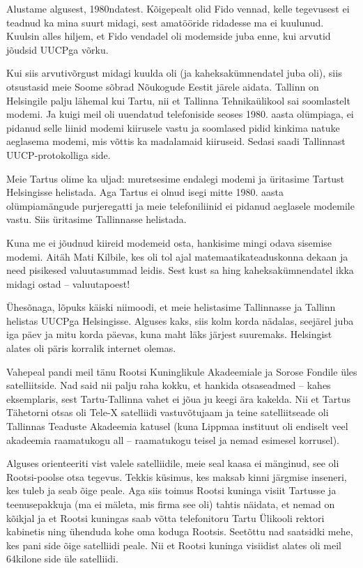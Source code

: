 Alustame algusest, 1980ndatest. Kõigepealt 
olid Fido vennad, kelle tegevusest ei teadnud ka mina 
suurt midagi, sest amatööride ridadesse ma ei kuulunud. Kuulsin 
alles hiljem, et Fido vendadel oli modemside juba enne, kui arvutid jõudsid UUCPga 
võrku. 

Kui siis arvutivõrgust midagi kuulda oli (ja kaheksakümnendatel juba
oli), siis otsustasid meie Soome sõbrad Nõukogude Eestit järele 
aidata. Tallinn on Helsingile palju lähemal kui Tartu, nii et Tallinna 
Tehnikaülikool sai soomlastelt modemi. Ja 
kuigi meil oli uuendatud telefoniside seoses 1980. aasta olümpiaga, ei pidanud 
selle liinid modemi kiirusele vastu ja soomlased pidid kinkima natuke 
aeglasema modemi, mis võttis ka madalamaid kiiruseid. Sedasi saadi Tallinnast 
UUCP-protokolliga side. 

Meie Tartus olime ka uljad: muretsesime 
endalegi modemi ja üritasime Tartust Helsingisse helistada. Aga Tartus ei 
olnud isegi mitte 1980. aasta olümpiamängude purjeregatti ja meie telefoniliinid 
ei pidanud aeglasele modemile vastu. Siis üritasime 
Tallinnasse helistada. 

Kuna me ei jõudnud kiireid modemeid osta, hankisime
mingi odava sisemise modemi. Aitäh Mati Kilbile, kes oli tol ajal matemaatikateaduskonna dekaan ja need pisikesed valuutasummad 
leidis. Sest kust sa hing kaheksakümnendatel ikka midagi ostad – valuutapoest! 

Ühesõnaga, lõpuks käiski niimoodi, et meie helistasime Tallinnasse ja Tallinn helistas UUCPga 
Helsingisse. Alguses kaks, siis kolm korda nädalas, seejärel juba 
iga päev ja mitu korda päevas, kuna maht läks järjest 
suuremaks. Helsingist alates oli päris korralik internet olemas. 


Vahepeal pandi meil tänu Rootsi Kuninglikule Akadeemiale ja 
Sorose Fondile üles satelliitside. Nad said nii palju raha 
kokku, et hankida otsaseadmed – kahes eksemplaris, sest Tartu-Tallinna vahet ei 
jõua ju keegi ära kakelda. Nii et Tartus Tähetorni otsas oli 
Tele-X satelliidi vastuvõtujaam ja teine satelliitseade oli Tallinnas Teaduste Akadeemia katusel (kuna Lippmaa 
instituut oli endiselt veel 
akadeemia raamatukogu all – raamatukogu teisel ja nemad 
esimesel korrusel). 

Alguses orienteeriti vist valele satelliidile, meie seal kaasa ei mänginud, see 
oli Rootsi-poolse otsa tegevus. Tekkis küsimus, kes maksab kinni
järgmise inseneri, kes tuleb ja seab õige peale. Aga siis toimus
Rootsi kuninga visiit Tartusse ja teenusepakkuja (ma ei mäleta, mis firma 
see oli) tahtis näidata, et nemad on kõikjal ja et Rootsi kuningas saab võtta 
telefonitoru Tartu Ülikooli rektori kabinetis ning ühenduda kohe oma koduga 
Rootsis. Seetõttu nad saatsidki mehe, kes pani side õige satelliidi peale. 
Nii et Rootsi kuninga visiidist alates oli meil 64kilone side üle satelliidi. 

